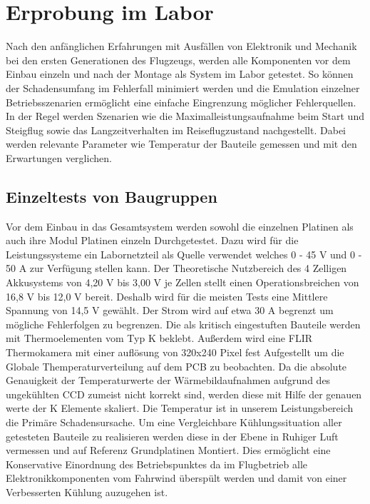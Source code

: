 \chapter{Erprobung im Labor}\label{cha:Erprobung im Labor}

Nach den anfänglichen Erfahrungen mit Ausfällen von Elektronik und Mechanik bei den ersten Generationen des Flugzeugs, werden alle Komponenten vor dem Einbau einzeln und nach der Montage als System im Labor getestet.
So können der Schadensumfang im Fehlerfall minimiert werden und die Emulation einzelner Betriebsszenarien ermöglicht eine einfache Eingrenzung möglicher Fehlerquellen.
In der Regel werden Szenarien wie die Maximalleistungsaufnahme beim Start und Steigflug sowie das Langzeitverhalten im Reiseflugzustand nachgestellt. Dabei werden relevante Parameter wie Temperatur der Bauteile gemessen und mit den Erwartungen verglichen.

\section{Einzeltests von Baugruppen}

Vor dem Einbau in das Gesamtsystem werden sowohl die einzelnen Platinen als auch ihre Modul Platinen einzeln Durchgetestet.
Dazu wird für die Leistungssysteme ein Labornetzteil als Quelle verwendet welches 0 - 45 V und 0 - 50 A zur Verfügung stellen kann.
Der Theoretische Nutzbereich des 4 Zelligen Akkusystems von 4,20 V bis 3,00 V je Zellen stellt einen Operationsbreichen von 16,8 V bis 12,0 V bereit. Deshalb wird für die meisten Tests eine Mittlere Spannung von 14,5 V gewählt. Der Strom wird auf etwa 30 A begrenzt um mögliche Fehlerfolgen zu begrenzen.
Die als kritisch eingestuften Bauteile werden mit Thermoelementen vom Typ K beklebt. Außerdem wird eine FLIR Thermokamera mit einer auflösung von 320x240 Pixel fest Aufgestellt um die Globale Themperaturverteilung auf dem PCB zu beobachten.
Da die absolute Genauigkeit der Temperaturwerte der Wärmebildaufnahmen aufgrund des ungekühlten CCD zumeist nicht korrekt sind, werden diese mit Hilfe der genauen werte der K Elemente skaliert.
Die Temperatur ist in unserem Leistungsbereich die Primäre Schadensursache. 
Um eine Vergleichbare Kühlungssituation aller getesteten Bauteile zu realisieren werden diese in der Ebene in Ruhiger Luft vermessen und auf Referenz Grundplatinen Montiert.
Dies ermöglicht eine Konservative Einordnung des Betriebspunktes da im Flugbetrieb alle Elektronikkomponenten vom Fahrwind überspült werden und damit von einer Verbesserten Kühlung auzugehen ist.

